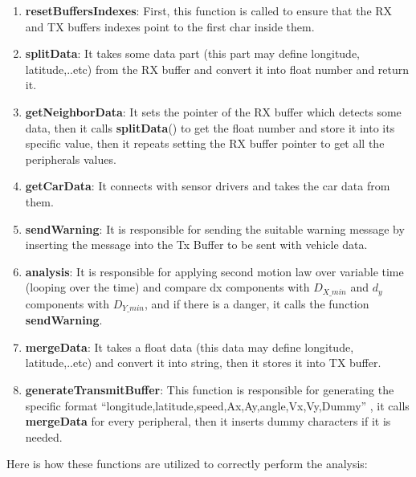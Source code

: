\begin{enumerate}
    \item \textbf{resetBuffersIndexes}: First, this function is called to ensure that the RX and TX buffers indexes point to the first char inside them.
    \item \textbf{splitData}: It takes some data part (this part may define longitude, latitude,..etc) from the RX buffer and convert it into float number and return it.
    \item \textbf{getNeighborData}: It sets the pointer of the RX buffer which detects some data, then it calls \textbf{splitData}() to get the float number and store it into its specific value, then it repeats setting the RX buffer pointer to get all the peripherals values.
    \item \textbf{getCarData}: It connects with sensor drivers and takes the car data from them.
    \item \textbf{sendWarning}: It is responsible for sending the suitable warning message by inserting the message into the Tx Buffer to be sent with vehicle data.
    \item \textbf{analysis}: It is responsible for applying second motion law over variable time (looping over the time) and compare dx components with $D_{X\_min}$ and $d_y$ components with $D_{Y\_min}$, and if there is a danger, it calls the function \textbf{sendWarning}.
    \item \textbf{mergeData}: It takes a float data (this data may define longitude, latitude,..etc) and convert it into string, then it stores it into TX buffer.
    \item \textbf{generateTransmitBuffer}: This function is responsible for generating the specific format “longitude,latitude,speed,Ax,Ay,angle,Vx,Vy,Dummy” , it calls \textbf{mergeData} for every peripheral, then it inserts dummy characters if it is needed.
\end{enumerate}
Here is how these functions are utilized to correctly perform the analysis:
